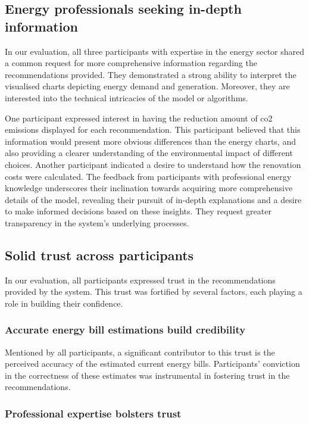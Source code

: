 \subsection{Energy professionals seeking in-depth information}

In our evaluation, all three participants with expertise in the energy sector shared a common request for more comprehensive information regarding the recommendations provided. 
They demonstrated a strong ability to interpret the visualised charts depicting energy demand and generation.
Moreover, they are interested into the technical intricacies of the model or algorithms. 

One participant expressed interest in having the reduction amount of \gls{co2} emissions displayed for each recommendation. 
This participant believed that this information would present more obvious differences than the energy charts, 
and also providing a clearer understanding of the environmental impact of different choices.
Another participant indicated a desire to understand how the renovation costs were calculated. 
The feedback from participants with professional energy knowledge underscores their inclination towards acquiring more comprehensive details of the model, 
revealing their pursuit of in-depth explanations and a desire to make informed decisions based on these insights. 
They request greater transparency in the system's underlying processes.


\subsection{Solid trust across participants}

In our evaluation, all participants expressed trust in the recommendations provided by the system. 
This trust was fortified by several factors, each playing a role in building their confidence.


\subsubsection{Accurate energy bill estimations build credibility}

Mentioned by all participants,
a significant contributor to this trust is the perceived accuracy of the estimated current energy bills. 
Participants' conviction in the correctness of these estimates was instrumental in fostering trust in the recommendations.


\subsubsection{Professional expertise bolsters trust}


